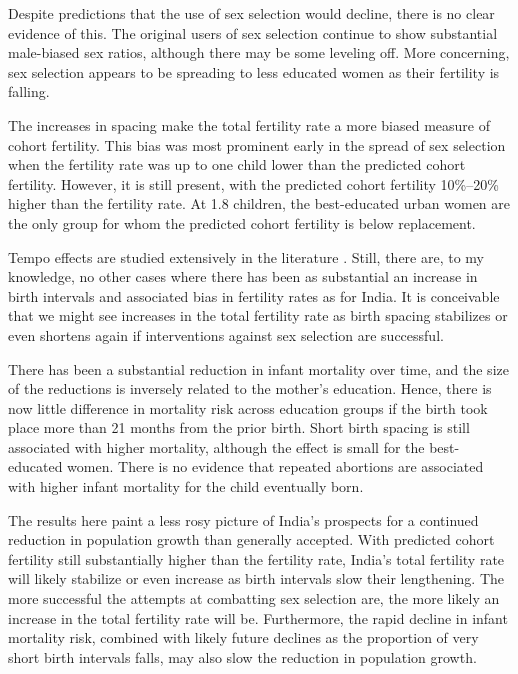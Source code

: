 \documentclass[12pt,letterpaper]{article}
\begin{document}
Despite predictions that the use of sex selection would decline, there is no clear 
evidence of this. 
The original users of sex selection continue to show substantial male-biased sex ratios, 
although there may be some leveling off. 
More concerning, sex selection appears to be spreading to less educated women as their 
fertility is falling.




The increases in spacing make the total fertility rate a more biased measure of cohort 
fertility. 
This bias was most prominent early in the spread of sex selection when the fertility rate 
was up to one child lower than the predicted cohort fertility. 
However, it is still present, with the predicted cohort fertility 10\%--20\% 
higher than the fertility rate. 
At 1.8 children, the best-educated urban women are the only group for whom the predicted 
cohort fertility is below replacement.

Tempo effects are studied extensively in the literature \citep[see, for example, ][]{Bongaarts1999}.
Still, there are, to my knowledge, no other cases where there has been as 
substantial an increase in birth intervals and associated bias in fertility rates 
as for India.
It is conceivable that we might see increases in the total fertility rate as birth spacing 
stabilizes or even shortens again if interventions against sex selection are successful.


There has been a substantial reduction in infant mortality over time, and the size of the 
reductions is inversely related to the mother's education.
Hence, there is now little difference in mortality risk across education groups if the 
birth took place more than 21 months from the prior birth.
Short birth spacing is still associated with higher mortality, although the effect is 
small for the best-educated women.
There is no evidence that repeated abortions are associated with higher infant mortality 
for the child eventually born. 


The results here paint a less rosy picture of India's prospects for a continued reduction 
in population growth than generally accepted. 
With predicted cohort fertility still substantially higher than the fertility rate, 
India's total fertility rate will likely stabilize or even increase as birth intervals slow 
their lengthening. 
The more successful the attempts at combatting sex selection are, the more likely an 
increase in the total fertility rate will be. 
Furthermore, the rapid decline in infant mortality risk, combined with likely future 
declines as the proportion of very short birth intervals falls, may also slow the 
reduction in population growth. 
\end{document}
